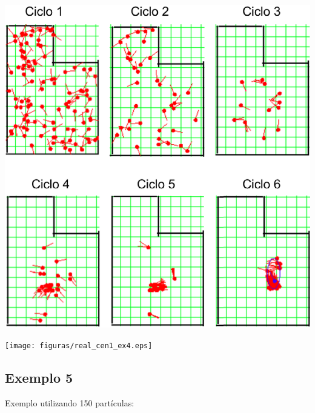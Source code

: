 {\centering
\includegraphics[scale=0.4]{figuras/cen1_ex4.eps}
\label{img:cen1_ex4}
\par}

{\centering
\texttt{[image: figuras/real\_cen1\_ex4.eps]}
\label{img:real_cen1_ex4}
\par}

\subsection{Exemplo 5}

Exemplo utilizando 150 partículas:


